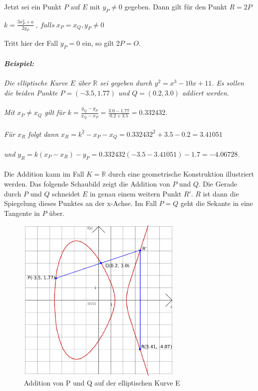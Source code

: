 \documentclass[a4paper,11pt]{article}
\begin{document}
Jetzt sei ein Punkt $P$ auf $E$ mit $y_P \neq 0$ gegeben. Dann gilt für den 
Punkt  $R=2P$
\begin{center} 
$k=\frac{3x_P^2+a}{2y_P}\ ,\ falls\ x_P = x_Q,y_P \neq 0$
\end{center}
Tritt hier der Fall $y_P = 0$ ein, so gilt $2P = O$.\\\\
{\it
\textbf{Beispiel:}\\\\
Die elliptische Kurve $E$ über $\mathbb R$ sei gegeben durch $y^2 = x^3-10x+11$.
Es sollen die beiden Punkte $P=(-3.5,1.77)$ und $Q=(0.2,3.0)$ addiert werden.\\\\ 
Mit $x_P \neq x_Q$ gilt für  
$k=\frac{y_Q-y_P}{x_Q-x_P} = \frac{3.0 - 1.77}{0.2 + 3.5} = 0.332432 $.\\\\
Für $x_R$ folgt dann $x_R = k^2-x_P-x_Q = 0.332432^2 + 3.5 - 0.2 = 3.41051$\\\\
und $y_R = k(x_P - x_R) - y_P = 0.332432(-3.5 - 3.41051) - 1.7 = -4.06728$.
}\\\\
Die Addition kann im Fall $K = \mathbb R$ durch eine geometrische Konstruktion
illustriert werden. Das folgende Schaubild zeigt die Addition von $P$ und $Q$.
Die Gerade durch $P$ und $Q$ schneidet $E$ in genau einem 
weitern Punkt $R'$. $R$ ist dann die Spiegelung dieses Punktes an der x-Achse. 
Im Fall $P=Q$ geht die Sekante in eine Tangente in $P$ über. 
\begin{figure}[ht]
\begin{center}
\includegraphics[width=8cm]{ec-2.eps}
\caption{Addition von P und Q auf der elliptischen Kurve E}
\end{center}
\end{figure}
\end{document}
